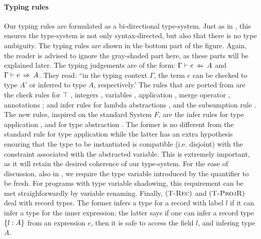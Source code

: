 \paragraph{Typing rules}
Our typing rules are formulated as a bi-directional type-system. 
Just as in \oldname, this ensures the type-system is not only syntax-directed, but
also that there is no type ambiguity.
The typing rules are shown in the bottom part of the figure. 
Again, the reader is advised to ignore the
gray-shaded part here, as these parts will be explained later. 
The typing judgements are of the form: $\Gamma \vdash e \ \!\Leftarrow\! \ A$ and  
$\Gamma \vdash e \ \!\Rightarrow\! \ A$.
They read: ``in the typing context $\Gamma$, the term $e$ can be checked to
type $A$' or inferred to type $A$, respectively.' 
The rules that are ported from \oldname are the
check rules for $\top$ , integers , 
variables ,  application , merge operator  
, annotations ; and infer rules
for lambda abstractions , and the subsumption rule 
.
The new rules, inspired on the standard System $F$, are the infer rules for
type application , and for type abstraction
.
The former is no different from the standard rule for type application while
the latter has an extra hypothesis ensuring that the type to be instantiated is
compatible (i.e. disjoint) with the constraint associated with the abstracted variable.
This is extremely important, as it will retain the desired coherence of our 
type-system.
For the ease of discussion, also in , we require the 
type variable introduced by the quantifier to be fresh. 
For programs with type variable shadowing, this requirement can be met 
straighforwardly by variable renaming.
Finally, $(\textsc{T-Rec})$ and $(\textsc{T-ProjR})$ deal with record types.
The former infers a type for a record with label $l$ if it can infer a type for the
inner expression; the latter says if one can infer a record type $\{ l : A \}$ 
from an expression $e$, then it is safe to access the field $l$, and infering type $A$.


